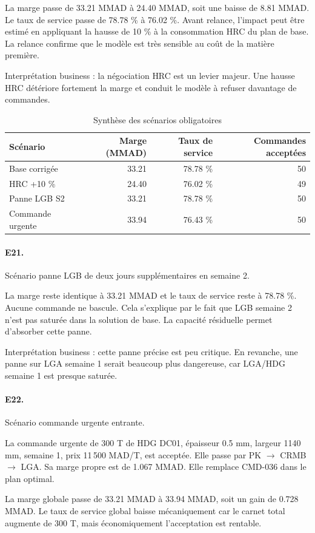 \documentclass[12pt,a4paper]{article}
\newcommand{\question}[1]{\paragraph{\textcolor{blue!50!black}{#1.}}}
\begin{document}
La marge passe de 33.21 MMAD à 24.40 MMAD, soit une baisse de 8.81 MMAD. Le taux de service passe de 78.78 \% à 76.02 \%. Avant relance, l'impact peut être estimé en appliquant la hausse de 10 \% à la consommation HRC du plan de base. La relance confirme que le modèle est très sensible au coût de la matière première.

Interprétation business : la négociation HRC est un levier majeur. Une hausse HRC détériore fortement la marge et conduit le modèle à refuser davantage de commandes.

\begin{table}[H]
\centering
\caption{Synthèse des scénarios obligatoires}
\label{tab:scenarios-obligatoires}
\begin{tabular}{lrrr}
\toprule
Scénario & Marge (MMAD) & Taux de service & Commandes acceptées \\
\midrule
Base corrigée & 33.21 & 78.78 \% & 50 \\
HRC +10 \% & 24.40 & 76.02 \% & 49 \\
Panne LGB S2 & 33.21 & 78.78 \% & 50 \\
Commande urgente & 33.94 & 76.43 \% & 50 \\
\bottomrule
\end{tabular}
\end{table}

\question{E21}
Scénario panne LGB de deux jours supplémentaires en semaine 2.

La marge reste identique à 33.21 MMAD et le taux de service reste à 78.78 \%. Aucune commande ne bascule. Cela s'explique par le fait que LGB semaine 2 n'est pas saturée dans la solution de base. La capacité résiduelle permet d'absorber cette panne.

Interprétation business : cette panne précise est peu critique. En revanche, une panne sur LGA semaine 1 serait beaucoup plus dangereuse, car LGA/HDG semaine 1 est presque saturée.

\question{E22}
Scénario commande urgente entrante.

La commande urgente de 300 T de HDG DC01, épaisseur 0.5 mm, largeur 1140 mm, semaine 1, prix 11\,500 MAD/T, est acceptée. Elle passe par PK $\rightarrow$ CRMB $\rightarrow$ LGA. Sa marge propre est de 1.067 MMAD. Elle remplace CMD-036 dans le plan optimal.

La marge globale passe de 33.21 MMAD à 33.94 MMAD, soit un gain de 0.728 MMAD. Le taux de service global baisse mécaniquement car le carnet total augmente de 300 T, mais économiquement l'acceptation est rentable.
\end{document}
